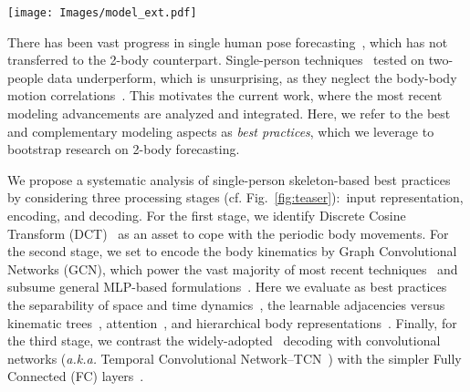 \documentclass[10pt,twocolumn,letterpaper]{article}
\begin{document}
\begin{figure*}[t]
    \centering
    \texttt{[image: Images/model\_ext.pdf]}
    \caption{
    The general architecture of a 2-body pose forecasting model employing best practices.
    First, 3D joint coordinates are mapped to frequencies by DCT coefficients, a best input representation practice.
    Secondly, body kinematics are encoded by layers of a GCN $\sigma( A_s A_t X W)$, with separable space-time adjacency matrices $\sigma(A_t,A_s)$, learned unconstrainedly, upon our proposed parameter initialization.
    Thirdly, the FC-based decoder outputs future poses for the two people, mapped to 3D coordinates with inverse-DCT (IDCT).}
    \label{fig:teaser}
\end{figure*}

There has been vast progress in single human pose forecasting~\cite{Dang21, Ma22, guo2022back}, which has not transferred to the 2-body counterpart.
Single-person techniques~\cite{benzine19, Dabral19, corona21} tested on two-people data underperform, which is unsurprising, as they neglect the body-body motion correlations~\cite{guo21}.
This motivates the current work, where the most recent modeling advancements are analyzed and integrated.
Here, we refer to the best and complementary modeling aspects as \emph{best practices}, which we leverage to bootstrap research on 2-body forecasting.

We propose a systematic analysis of single-person skeleton-based best practices by considering three processing stages (cf. Fig.~\ref{fig:teaser}): input representation, encoding, and decoding.
For the first stage, we identify Discrete Cosine Transform (DCT)~\cite{cai20, guo21, mao20his, mao19ltd, mao21multi} as an asset to cope with the periodic body movements.
For the second stage, we set to encode the body kinematics by Graph Convolutional Networks (GCN), which power the vast majority of most recent techniques~\cite{mao19ltd, mao20his, mao21multi, guo21, sofianos21, guo2022back} and subsume general MLP-based formulations~\cite{guo2022back}.
Here we evaluate as best practices the separability of space and time dynamics~\cite{sofianos21}, the learnable adjacencies versus kinematic trees~\cite{yan18}, attention~\cite{guo21}, and hierarchical body representations~\cite{Dang21}. 
Finally, for the third stage, we contrast the widely-adopted~\cite{sofianos21, Ma22, sampieri22} decoding with convolutional networks (\textit{a.k.a.} Temporal Convolutional Network--TCN~\cite{bai2018empirical}) with the simpler Fully Connected (FC) layers~\cite{guo2022back}.
\end{document}

